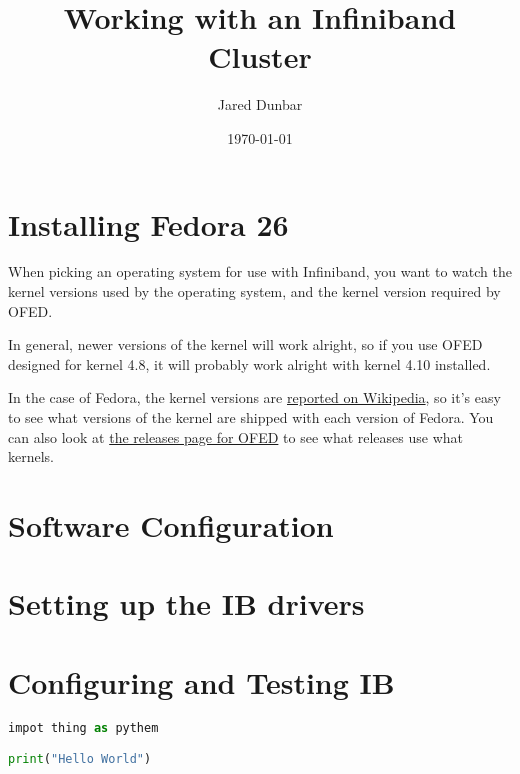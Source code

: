 \documentclass{article}
\begin{document}
\title{Working with an Infiniband Cluster}
\author{Jared Dunbar}
\date{\today}
\maketitle
\tableofcontents

\section{Installing Fedora 26}

When picking an operating system for use with Infiniband, you want to watch the kernel versions used by the operating system, and the kernel version required by OFED.

In general, newer versions of the kernel will work alright, so if you use OFED designed for kernel 4.8, it will probably work alright with kernel 4.10 installed.

In the case of Fedora, the kernel versions are \href{https://en.wikipedia.org/wiki/Fedora_(operating_system)#Releases}{reported on Wikipedia}, so it's easy to see what versions of the kernel are shipped with each version of Fedora. You can also look at \href{http://downloads.openfabrics.org/OFED/}{the releases page for OFED} to see what releases use what kernels.

\section{Software Configuration}

\section{Setting up the IB drivers}

\section{Configuring and Testing IB}

\begin{lstlisting}[language=Python, caption=Python Example]
impot thing as pythem

print("Hello World")

\end{lstlisting}
\end{document}
